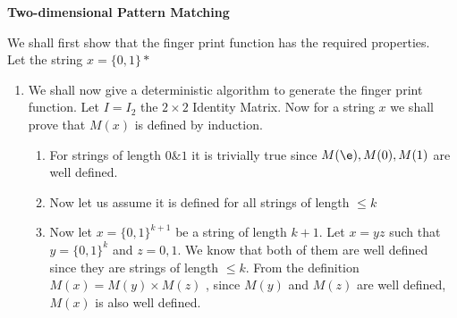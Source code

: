 \documentclass{assignment}
\begin{document}
\begin{problemlist}
\pbitem
\begin{problem}
\textbf{Two-dimensional Pattern Matching}
\begin{answer}
We shall first show that the finger print function has the required properties. \\
Let the string $x=\{0,1\}*$ \\
\begin{enumerate}
 \item We shall now give a deterministic algorithm to generate the finger print function. Let $I = I_2$ the $2 \times 2$ Identity Matrix. Now for a string $x$ we shall prove that $M(x)$ is defined by induction. 
\begin{enumerate}
 \item For strings of length $0 \& 1$ it is trivially true since $M(\e),M(0),M(1)$ are well defined. 
 \item Now let us assume it is defined for all strings of length $\leq k$
 \item Now let $x=\{0,1\}^{k+1}$ be a string of length $k+1$. Let $x=yz$ such that $y=\{0,1\}^k$ and $z={0,1}$. We know that both of them are well defined since they are strings of length $\leq k$. From the definition $M(x)= M(y) \times M(z)$ , since $M(y)$ and $M(z)$ are well defined, $M(x)$ is also well defined.  
\end{enumerate}


\end{enumerate}
\end{answer}
\end{problem}
\end{problemlist}
\end{document}
